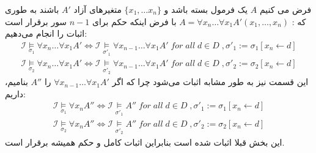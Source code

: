 \documentclass[]{exam}
\begin{document}
فرض می کنیم $A$ یک فرمول بسته باشد و $\lbrace x_1, \dots x_n \rbrace$
متغیرهای آزاد $A'$ باشند به طوری که : $A = \forall x_n \dots \forall x_1 A'(x_1, \dots, x_n)$
با فرض اینکه حکم برای $n-1$ سور برقرار است اثبات را انجام می‌دهیم:
\begin{align}
    \mathscr{I} \underset{\sigma_1}{\models} \forall x_n \dots \forall x_1 A' \Longleftrightarrow \mathscr{I} \underset{\sigma'_1}{\models} 
    \forall x_{n-1} \dots \forall x_1 A' \; for \; all \; d \in D \;, \sigma'_1 := \sigma_1[x_n \leftarrow d] \\
    \mathscr{I} \underset{\sigma_2}{\models} \forall x_n \dots \forall x_1 A' \Longleftrightarrow \mathscr{I} \underset{\sigma'_2}{\models} 
    \forall x_{n-1} \dots \forall x_1 A' \; for \; all \; d \in D \;, \sigma'_2 := \sigma_2[x_n \leftarrow d]
\end{align}
این قسمت نیز به طور مشابه اثبات می‌شود چرا که اگر $\forall x_{n-1} \dots \forall x_1 A'$ را $A''$ بنامیم، داریم:
\begin{align}
    \mathscr{I} \underset{\sigma_1}{\models} \forall x_n A'' \Longleftrightarrow \mathscr{I} \underset{\sigma'_1}{\models} 
    A'' \; for \; all \; d \in D \;, \sigma'_1 := \sigma_1[x_n \leftarrow d] \\
    \mathscr{I} \underset{\sigma_2}{\models} \forall x_n A'' \Longleftrightarrow \mathscr{I} \underset{\sigma'_2}{\models} 
    A'' \; for \; all \; d \in D \;, \sigma'_2 := \sigma_2[x_n \leftarrow d]
\end{align}
این بخش قبلا اثبات شده است بنابراین اثبات کامل و حکم همیشه برقرار است.
\end{document}
